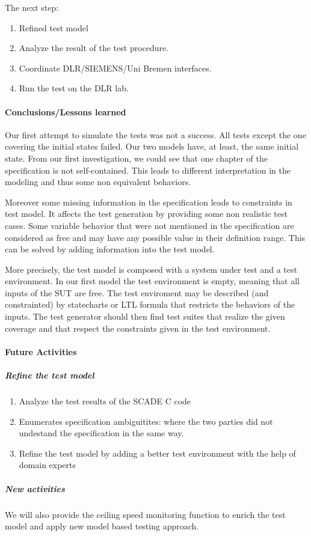  The next step:
 \begin{enumerate}
 \item Refined test model
 \item Analyze the result of the test procedure.
 \item Coordinate DLR/SIEMENS/Uni Bremen interfaces.
 \item Run the test on the DLR lab.
 \end{enumerate}

\paragraph{Conclusions/Lessons learned}

Our first attempt to simulate the tests was not a success. All tests
except the one covering the initial states failed. Our two models
have, at least, the same initial state.
From  our first investigation, we could see that one chapter of
the specification is not self-contained. This leads to different
interpretation in the modeling and thus some non equivalent behaviors.

Moreover some missing information in the specification leads to 
 constraints in test model. It affects the test generation by
providing some non realistic test cases. Some variable behavior that
were not mentioned in the specification are considered as free and may have any
possible value in their definition range. This can be solved by adding
information into the test model. 

More precisely, the test model is composed with a system under test
and a test environment. In our first model the test environment is
empty, meaning that all inputs of the SUT are free. The test
enviroment may be described (and constrainted) by statecharts or
LTL formula that restricts the behaviors of the inputs. The test
generator should then find  test suites that realize the given
coverage and that respect the constraints given in the test environment.



\paragraph{Future Activities}
\subparagraph{Refine the test model}
\begin{enumerate}
\item Analyze the test results of the SCADE C code
\item Enumerates specification ambiguitites: where the two parties did
  not undestand the specification in the same way.
\item Refine the test model by adding a better test environment with
  the help of domain experts
\end{enumerate}
\subparagraph{New activities}
We will also provide the ceiling speed monitoring function to enrich
the test model and apply new model based testing approach.

%
%

